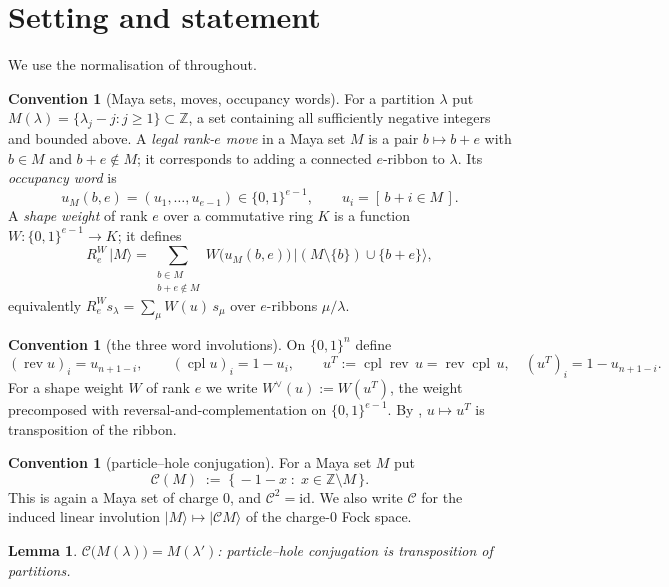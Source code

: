 \documentclass[11pt]{article}
\newtheorem{lemma}[theorem]{Lemma}
\theoremstyle{definition}
\newtheorem{convention}[theorem]{Convention}
\theoremstyle{remark}
\newcommand{\Z}{\mathbb{Z}}
\newcommand{\Cop}{\mathcal{C}}
\newcommand{\rev}{\operatorname{rev}}
\newcommand{\cpl}{\operatorname{cpl}}
\begin{document}
\tableofcontents

\section{Setting and statement}

We use the normalisation of \cite{Q149} throughout.

\begin{convention}[Maya sets, moves, occupancy words]\label{conv:setup}
For a partition $\lambda$ put $M(\lambda)=\{\lambda_j-j:j\ge1\}\subset\Z$, a set containing
all sufficiently negative integers and bounded above.  A \emph{legal rank-$e$ move} in a
Maya set $M$ is a pair $b\mapsto b+e$ with $b\in M$ and $b+e\notin M$; it corresponds to
adding a connected $e$-ribbon to $\lambda$.  Its \emph{occupancy word} is
\[
   u_M(b,e)=(u_1,\dots,u_{e-1})\in\{0,1\}^{e-1},\qquad u_i=[\,b+i\in M\,].
\]
A \emph{shape weight} of rank $e$ over a commutative ring $K$ is a function
$W:\{0,1\}^{e-1}\to K$; it defines
\[
   R_e^{W}\,|M\rangle=\sum_{\substack{b\in M\\ b+e\notin M}} W\bigl(u_M(b,e)\bigr)\,
   \bigl|(M\setminus\{b\})\cup\{b+e\}\bigr\rangle,
\]
equivalently $R_e^{W}s_\lambda=\sum_\mu W(u)\,s_\mu$ over $e$-ribbons $\mu/\lambda$.
\end{convention}

\begin{convention}[the three word involutions]\label{conv:invol}
On $\{0,1\}^{n}$ define
\[
  (\rev u)_i=u_{n+1-i},\qquad (\cpl u)_i=1-u_i,\qquad
  u^{T}:=\cpl\rev\,u=\rev\cpl\,u,\quad (u^{T})_i=1-u_{n+1-i}.
\]
For a shape weight $W$ of rank $e$ we write $W^\vee(u):=W(u^{T})$, the weight precomposed
with reversal-and-complementation on $\{0,1\}^{e-1}$.  By
\cite[Lem.~\texttt{lem:transpose}]{Q149}, $u\mapsto u^{T}$ is transposition of the ribbon.
\end{convention}

\begin{convention}[particle--hole conjugation]\label{conv:C}
For a Maya set $M$ put
\[
   \Cop(M)\;:=\;\{\,-1-x \;:\; x\in\Z\setminus M\,\}.
\]
This is again a Maya set of charge $0$, and $\Cop^2=\mathrm{id}$.  We also write $\Cop$ for
the induced linear involution $|M\rangle\mapsto|\Cop M\rangle$ of the charge-$0$ Fock
space.
\end{convention}

\begin{lemma}\label{lem:Ctrans}
$\Cop\bigl(M(\lambda)\bigr)=M(\lambda')$: particle--hole conjugation is transposition of
partitions.
\end{lemma}
\end{document}
